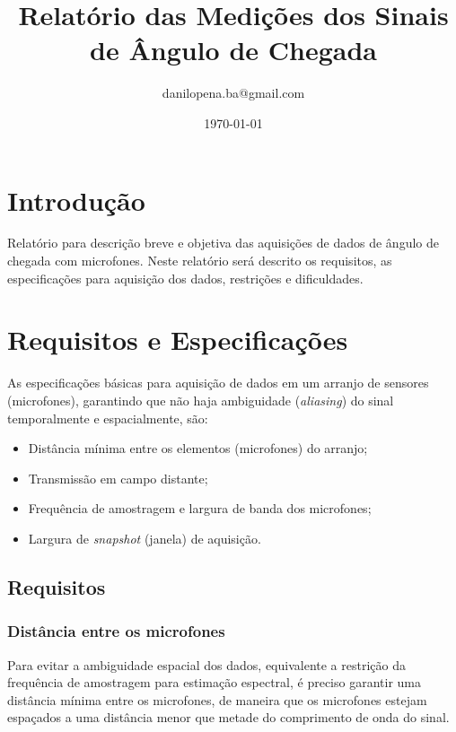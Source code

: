 \documentclass[a4paper,oneside,12pt]{article}
\begin{document}
\title{Relatório das Medições dos Sinais de Ângulo de Chegada}
\author{danilopena.ba@gmail.com}
\date{\today}
\maketitle

\section{Introdução}

Relatório para descrição breve e objetiva das aquisições de dados de ângulo de chegada com microfones. Neste relatório será descrito os requisitos, as especificações para aquisição dos dados, restrições e dificuldades. 

\section{Requisitos e Especificações}

As especificações básicas para aquisição de dados em um arranjo de sensores (microfones), garantindo que não haja ambiguidade (\emph{aliasing}) do sinal temporalmente e espacialmente, são:

\begin{itemize}
\item Distância mínima entre os elementos (microfones) do arranjo;
\item Transmissão em campo distante;
\item Frequência de amostragem e largura de banda dos microfones;
\item Largura de \emph{snapshot} (janela) de aquisição.
\end{itemize}

\subsection{Requisitos}

\subsubsection{Distância entre os microfones}

Para evitar a ambiguidade espacial dos dados, equivalente a restrição da frequência de amostragem para estimação espectral, é preciso garantir uma distância mínima entre os microfones, de maneira que os microfones estejam espaçados a uma distância menor que metade do comprimento de onda do sinal.
\end{document}
